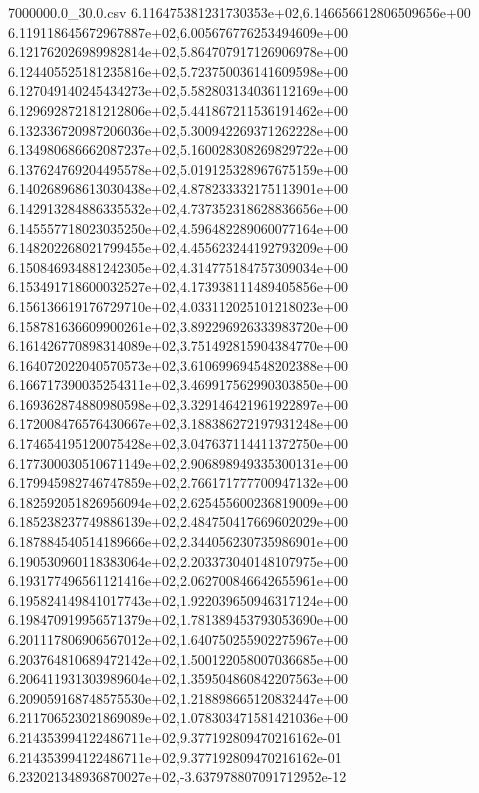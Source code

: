 \begin{filecontents*}{7000000.0_30.0.csv}
6.116475381231730353e+02,6.146656612806509656e+00
6.119118645672967887e+02,6.005676776253494609e+00
6.121762026989982814e+02,5.864707917126906978e+00
6.124405525181235816e+02,5.723750036141609598e+00
6.127049140245434273e+02,5.582803134036112169e+00
6.129692872181212806e+02,5.441867211536191462e+00
6.132336720987206036e+02,5.300942269371262228e+00
6.134980686662087237e+02,5.160028308269829722e+00
6.137624769204495578e+02,5.019125328967675159e+00
6.140268968613030438e+02,4.878233332175113901e+00
6.142913284886335532e+02,4.737352318628836656e+00
6.145557718023035250e+02,4.596482289060077164e+00
6.148202268021799455e+02,4.455623244192793209e+00
6.150846934881242305e+02,4.314775184757309034e+00
6.153491718600032527e+02,4.173938111489405856e+00
6.156136619176729710e+02,4.033112025101218023e+00
6.158781636609900261e+02,3.892296926333983720e+00
6.161426770898314089e+02,3.751492815904384770e+00
6.164072022040570573e+02,3.610699694548202388e+00
6.166717390035254311e+02,3.469917562990303850e+00
6.169362874880980598e+02,3.329146421961922897e+00
6.172008476576430667e+02,3.188386272197931248e+00
6.174654195120075428e+02,3.047637114411372750e+00
6.177300030510671149e+02,2.906898949335300131e+00
6.179945982746747859e+02,2.766171777700947132e+00
6.182592051826956094e+02,2.625455600236819009e+00
6.185238237749886139e+02,2.484750417669602029e+00
6.187884540514189666e+02,2.344056230735986901e+00
6.190530960118383064e+02,2.203373040148107975e+00
6.193177496561121416e+02,2.062700846642655961e+00
6.195824149841017743e+02,1.922039650946317124e+00
6.198470919956571379e+02,1.781389453793053690e+00
6.201117806906567012e+02,1.640750255902275967e+00
6.203764810689472142e+02,1.500122058007036685e+00
6.206411931303989604e+02,1.359504860842207563e+00
6.209059168748575530e+02,1.218898665120832447e+00
6.211706523021869089e+02,1.078303471581421036e+00
6.214353994122486711e+02,9.377192809470216162e-01
6.214353994122486711e+02,9.377192809470216162e-01
6.232021348936870027e+02,-3.637978807091712952e-12
\end{filecontents*}


